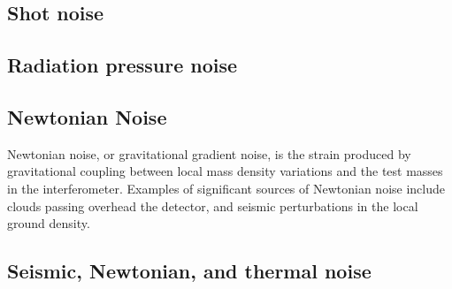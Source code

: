 
\subsection{Shot noise}
\label{sec:shot-noise}

\subsection{Radiation pressure noise}
\label{sec:radi-press-noise}


\subsection{Newtonian Noise}
\label{sec:newtonian-noise}

Newtonian noise, or gravitational gradient noise, is the strain
produced by gravitational coupling between local mass density
variations and the test masses in the interferometer. Examples of
significant sources of Newtonian noise include clouds passing overhead
the detector, and seismic perturbations in the local ground density.

\subsection{Seismic, Newtonian, and thermal noise}
\label{sec:seismic-noise}

